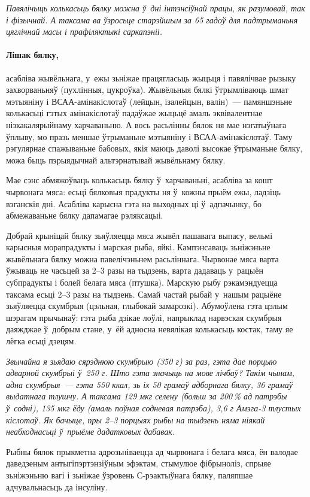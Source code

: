 \emph{Павялічыць колькасьць бялку можна ў~дні інтэнсіўнай працы, як разумовай, так і фізычнай. А таксама ва ўзросьце старэйшым за 65 гадоў для падтрыманьня цяглічнай масы і прафіляктыкі саркапэніі.}

\paragraph{Лішак бялку,} асабліва жывёльнага, у~ежы зьніжае працягласьць жыцьця і павялічвае рызыку захворваньняў (пухлінныя, цукроўка). Жывёльныя бялкі ўтрымліваюць шмат мэтыяніну і ВСАА-амінакіслотаў (лейцын, ізалейцын, валін)~--- памяншэньне колькасьці гэтых амінакіслотаў падаўжае жыцьцё амаль эквівалентнае нізкакалярыйнаму харчаваньню. А вось расьлінны бялок ня мае нэгатыўнага ўплыву, мо празь меншае ўтрыманьне мэтыяніну і ВСАА-амінакіслотаў. Таму рэгулярнае спажываньне бабовых, якія маюць даволі высокае ўтрыманьне бялку, можа быць пэрыядычнай альтэрнатывай жывёльнаму бялку.

Мае сэнс абмяжоўваць колькасьць бялку ў~харчаваньні, асабліва за кошт чырвонага мяса: есьці бялковыя прадукты ня ў~кожны прыём ежы, ладзіць вэганскія дні. Асабліва карысна гэта на выходных ці ў~адпачынку, бо абмежаваньне бялку дапамагае рэляксацыі.

Добрай крыніцай бялку зьяўляецца мяса жывёл пашавага выпасу, вельмі карысныя морапрадукты і марская рыба, яйкі. Кампэнсаваць зьніжэньне жывёльнага бялку можна павелічэньнем расьліннага. Чырвонае мяса варта ўжываць не часьцей за 2--3 разы на тыдзень, варта дадаваць у~рацыён субпрадукты і болей белага мяса (птушка). Марскую рыбу рэкамэндуецца таксама есьці 2--3 разы на тыдзень. Самай частай рыбай у~нашым рацыёне зьяўляецца скумбрыя (цэльная, глыбокай замарозкі). Абумоўлена гэта цэлым шэрагам прычынаў: гэта рыба дзікае лоўлі, напрыклад нарвэская скумбрыя даяжджае ў~добрым стане, у~ёй адносна невялікая колькасьць костак, таму яе лёгка есьці дзецям.

\emph{Звычайна я зьядаю сярэднюю скумбрыю (350 г) за раз, гэта дае порцыю адварной скумбрыі ў~250 г. Што гэта значыць на мове лічбаў? Такім чынам, адна скумбрыя~--- гэта 550 ккал, зь іх 50 грамаў адборнага бялку, 36 грамаў выдатнага тлушчу. А таксама 129 мкг селену (больш за 200\,\% ад патрэбы ў~содні), 135 мкг ёду (амаль поўная содневая патрэба), 3,6 г Амэга-3 тлустых кіслотаў. Як бачыце, пры 2--3 порцыях рыбы на тыдзень няма ніякай неабходнасьці ў~прыёме дадатковых дабавак.}

Рыбны бялок прыкметна адрозьніваецца ад чырвонага і белага мяса, ён валодае даведзеным антыгіпэртэнзіўным эфэктам, стымулюе фібрыноліз, спрыяе зьніжэньню вагі і зьніжае ўзровень С-рэактыўнага бялку, паляпшае адчувальнасьць да інсуліну. 

